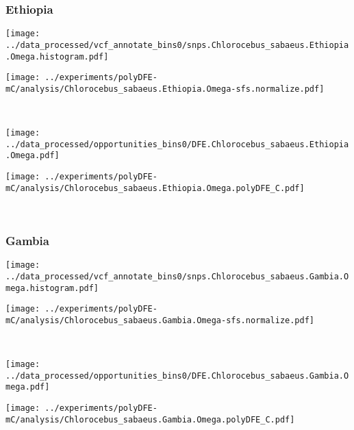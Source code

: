 \subsubsection{Ethiopia}

\begin{minipage}{0.49\linewidth}
    \texttt{[image: ../data\_processed/vcf\_annotate\_bins0/snps.Chlorocebus\_sabaeus.Ethiopia.Omega.histogram.pdf]}
\end{minipage}
\begin{minipage}{0.49\linewidth}
    \texttt{[image: ../experiments/polyDFE-mC/analysis/Chlorocebus\_sabaeus.Ethiopia.Omega-sfs.normalize.pdf]}
\end{minipage}
\\
\begin{minipage}{0.49\linewidth}
    \texttt{[image: ../data\_processed/opportunities\_bins0/DFE.Chlorocebus\_sabaeus.Ethiopia.Omega.pdf]}
\end{minipage}
\begin{minipage}{0.49\linewidth}
    \texttt{[image: ../experiments/polyDFE-mC/analysis/Chlorocebus\_sabaeus.Ethiopia.Omega.polyDFE\_C.pdf]}
\end{minipage}
\\

\subsubsection{Gambia}

\begin{minipage}{0.49\linewidth}
    \texttt{[image: ../data\_processed/vcf\_annotate\_bins0/snps.Chlorocebus\_sabaeus.Gambia.Omega.histogram.pdf]}
\end{minipage}
\begin{minipage}{0.49\linewidth}
    \texttt{[image: ../experiments/polyDFE-mC/analysis/Chlorocebus\_sabaeus.Gambia.Omega-sfs.normalize.pdf]}
\end{minipage}
\\
\begin{minipage}{0.49\linewidth}
    \texttt{[image: ../data\_processed/opportunities\_bins0/DFE.Chlorocebus\_sabaeus.Gambia.Omega.pdf]}
\end{minipage}
\begin{minipage}{0.49\linewidth}
    \texttt{[image: ../experiments/polyDFE-mC/analysis/Chlorocebus\_sabaeus.Gambia.Omega.polyDFE\_C.pdf]}
\end{minipage}
\\

